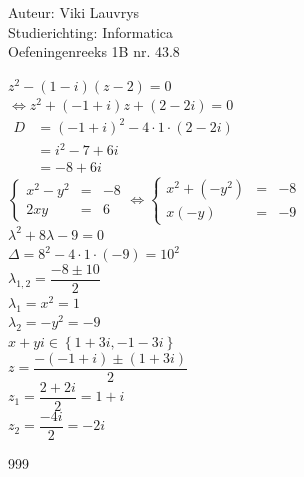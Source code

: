 \documentclass[a4paper]{article}
\begin{document}
  
\noindent \large Auteur: Viki Lauvrys        \\
\noindent \large Studierichting: Informatica \\
\noindent \large Oefeningenreeks 1B nr. 43.8 \\

\medskip

\normalsize

$z^2 - (1 -i)(z -2) = 0$ \\

$\Leftrightarrow z^2 + (-1 +i)z +(2 -2i) = 0$ \\

$\begin{array}{lll}
D & = (-1 +i)^2 -4 \cdot 1 \cdot (2 -2i) \\
& = i^2 -7 +6i \\
& = -8 +6i
\end{array}$ \\

$\left\{
	\begin{array}{lll}
		x^2 - y^2 & = & -8 \\
		2xy & = & 6
	\end{array}
\right .
\Leftrightarrow
\left\{
	\begin{array}{lll}
		x^2 + (-y^2) & = & -8 \\
		x (-y) & = & -9
	\end{array}
\right .$ \\

$\lambda^2 + 8 \lambda - 9 = 0$ \\

$\Delta = 8^2 - 4 \cdot 1 \cdot (-9) = 10^2$ \\

$\lambda_{1, 2} = \dfrac{-8 \pm 10}{2}$ \\

$\lambda_1 = x^2 = 1$ \\

$\lambda_2 = -y^2 = -9$ \\

$x + yi \in \left\{1 +3i, -1 -3i \right\}$ \\

$z = \dfrac{-(-1 +i) \pm (1 +3i)}{2}$ \\

$z_1 = \dfrac{2 +2i}{2} = 1 +i$ \\

$z_2 = \dfrac{-4i}{2} = -2i$ \\





\begin{thebibliography}{999}
\end{thebibliography}
\end{document}
